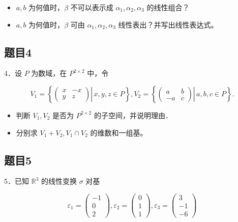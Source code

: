 \documentclass{article}
\begin{document}
\begin{itemize}
  \item[（1）] \(a, b\) 为何值时，\(\beta\) 不可以表示成 \(\alpha_{1}, \alpha_{2}, \alpha_{3}\) 的线性组合？
  \item[（2）] \(a, b\) 为何值时，\(\beta\) 可由 \(\alpha_{1}, \alpha_{2}, \alpha_{3}\) 线性表出？并写出线性表达式。
\end{itemize}

\subsection{题目4}
4．设 \(P\) 为数域，在 \(P^{2 \times 2}\) 中，令

\[
V_{1}=\left\{\left.\left(\begin{array}{cc}
x & -x \\
y & z
\end{array}\right) \right\rvert\, x, y, z \in P\right\}, V_{2}=\left\{\left.\left(\begin{array}{cc}
a & b \\
-a & c
\end{array}\right) \right\rvert\, a, b, c \in P\right\} .
\]

\begin{itemize}
  \item[（1）] 判断 \(V_{1}, V_{2}\) 是否为 \(P^{2 \times 2}\) 的子空间，并说明理由．
  \item[（2）] 分别求 \(V_{1}+V_{2}, V_{1} \cap V_{2}\) 的维数和一组基。
\end{itemize}

\subsection{题目5}
5．已知 \(\mathbb{R}^{3}\) 的线性变换 \(\sigma\) 对基

\[
\varepsilon_{1}=\left(\begin{array}{c}
-1 \\
0 \\
2
\end{array}\right), \varepsilon_{2}=\left(\begin{array}{l}
0 \\
1 \\
1
\end{array}\right), \varepsilon_{3}=\left(\begin{array}{c}
3 \\
-1 \\
-6
\end{array}\right)
\]
\end{document}

